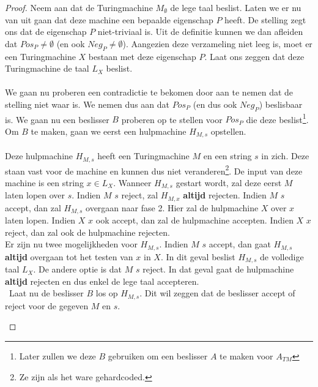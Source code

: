\documentclass[
10pt,
a4paper,
oneside,
headinclude,footinclude, 
BCOR5mm,
]{scrartcl}
\begin{document}
\begin{proof}
	Neem aan dat de Turingmachine $M_\emptyset$ de lege taal beslist. Laten we er nu van uit gaan dat deze machine een bepaalde eigenschap $P$ heeft. De stelling zegt ons dat de eigenschap $P$ niet-triviaal is. Uit de definitie kunnen we dan afleiden dat $Pos_P \neq \emptyset$ (en ook $Neg_P \neq \emptyset$). Aangezien deze verzameling niet leeg is, moet er een Turingmachine $X$ bestaan met deze eigenschap $P$. Laat ons zeggen dat deze Turingmachine de taal $L_X$ beslist.\\\\
	We gaan nu proberen een contradictie te bekomen door aan te nemen dat de stelling niet waar is. We nemen dus aan dat $Pos_P$ (en dus ook $Neg_P$) beslisbaar is. We gaan nu een beslisser $B$ proberen op te stellen voor $Pos_P$ die deze beslist\footnote{Later zullen we deze $B$ gebruiken om een beslisser $A$ te maken voor $A_{TM}$}. Om $B$ te maken, gaan we eerst een hulpmachine $H_{M,s}$ opstellen.\\\\
	Deze hulpmachine $H_{M,s}$ heeft een Turingmachine $M$ en een string $s$ in zich. Deze staan vast voor de machine en kunnen dus niet veranderen\footnote{Ze zijn als het ware gehardcoded.}. De input van deze machine is een string $x \in L_X$. Wanneer $H_{M,s}$ gestart wordt, zal deze eerst $M$ laten lopen over $s$. Indien $M$ $s$ reject, zal $H_{M,x}$ \textbf{altijd} rejecten. Indien $M$ $s$ accept, dan zal $H_{M,s}$ overgaan naar fase 2. Hier zal de hulpmachine $X$ over $x$ laten lopen. Indien $X$ $x$ ook accept, dan zal de hulpmachine accepten. Indien $X$ $x$ reject, dan zal ook de hulpmachine rejecten.\\
	Er zijn nu twee mogelijkheden voor $H_{M,s}$. Indien $M$ $s$ accept, dan gaat $H_{M,s}$ \textbf{altijd} overgaan tot het testen van $x$ in $X$. In dit geval beslist $H_{M,s}$ de volledige taal $L_X$. De andere optie is dat $M$ $s$ reject. In dat geval gaat de hulpmachine \textbf{altijd} rejecten en dus enkel de lege taal accepteren.\\\
	Laat nu de beslisser $B$ los op $H_{M,s}$. Dit wil zeggen dat de beslisser accept of reject voor de gegeven $M$ en $s$.\\
	
\begin{figure}[h!]
\begin{tikzpicture}[->,>=stealth',shorten >=1pt,auto,node distance=2.8cm,
                    semithick]


\end{tikzpicture}
\end{figure}
\end{proof}
\end{document}
